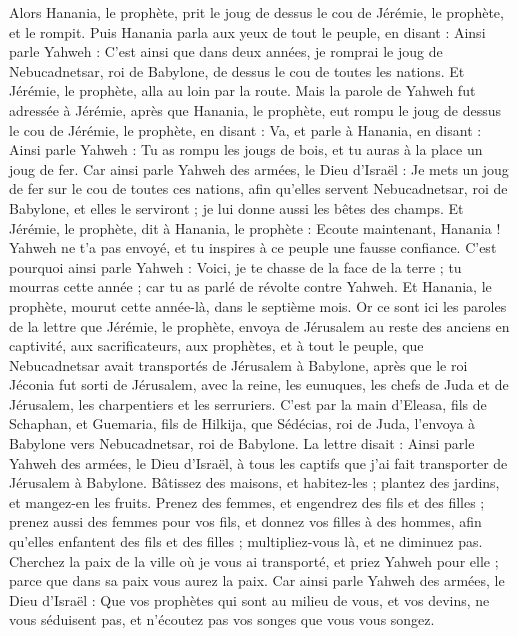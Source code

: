 \begin{multicols}{2}
Alors Hanania, le prophète, prit le joug de dessus le cou de Jérémie, le prophète, et le rompit.
Puis Hanania parla aux yeux de tout le peuple, en disant : Ainsi parle Yahweh : C’est ainsi que dans deux années, je romprai le joug de Nebucadnetsar, roi de Babylone, de dessus le cou de toutes les nations. Et Jérémie, le prophète, alla au loin par la route.
Mais la parole de Yahweh fut adressée à Jérémie, après que Hanania, le prophète, eut rompu le joug de dessus le cou de Jérémie, le prophète, en disant :
Va, et parle à Hanania, en disant : Ainsi parle Yahweh : Tu as rompu les jougs de bois, et tu auras à la place un joug de fer.
Car ainsi parle Yahweh des armées, le Dieu d'Israël : Je mets un joug de fer sur le cou de toutes ces nations, afin qu'elles servent Nebucadnetsar, roi de Babylone, et elles le serviront ; je lui donne aussi les bêtes des champs.
Et Jérémie, le prophète, dit à Hanania, le prophète : Ecoute maintenant, Hanania ! Yahweh ne t'a pas envoyé, et tu inspires à ce peuple une fausse confiance.
C'est pourquoi ainsi parle Yahweh : Voici, je te chasse de la face de la terre ; tu mourras cette année ; car tu as parlé de révolte contre Yahweh.
Et Hanania, le prophète, mourut cette année-là, dans le septième mois.
\VerseOne{}Or ce sont ici les paroles de la lettre que Jérémie, le prophète, envoya de Jérusalem au reste des anciens en captivité, aux sacrificateurs, aux prophètes, et à tout le peuple, que Nebucadnetsar avait transportés de Jérusalem à Babylone,
après que le roi Jéconia fut sorti de Jérusalem, avec la reine, les eunuques, les chefs de Juda et de Jérusalem, les charpentiers et les serruriers.
C’est par la main d’Eleasa, fils de Schaphan, et Guemaria, fils de Hilkija, que Sédécias, roi de Juda, l’envoya à Babylone vers Nebucadnetsar, roi de Babylone. La lettre disait :
Ainsi parle Yahweh des armées, le Dieu d'Israël, à tous les captifs que j'ai fait transporter de Jérusalem à Babylone.
Bâtissez des maisons, et habitez-les ; plantez des jardins, et mangez-en les fruits.
Prenez des femmes, et engendrez des fils et des filles ; prenez aussi des femmes pour vos fils, et donnez vos filles à des hommes, afin qu'elles enfantent des fils et des filles ; multipliez-vous là, et ne diminuez pas.
Cherchez la paix de la ville où je vous ai transporté, et priez Yahweh pour elle ; parce que dans sa paix vous aurez la paix.
Car ainsi parle Yahweh des armées, le Dieu d'Israël : Que vos prophètes qui sont au milieu de vous, et vos devins, ne vous séduisent pas, et n’écoutez pas vos songes que vous vous songez.

\end{multicols}
